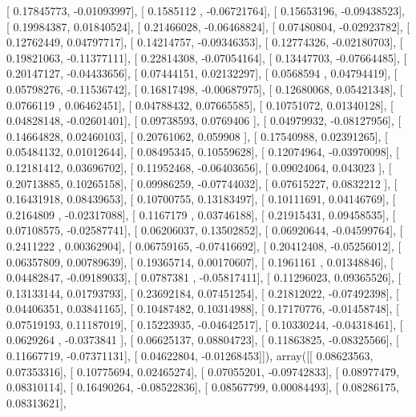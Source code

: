 \documentclass{article}
\begin{document}
       [ 0.17845773, -0.01093997],
       [ 0.1585112 , -0.06721764],
       [ 0.15653196, -0.09438523],
       [ 0.19984387,  0.01840524],
       [ 0.21466028, -0.06468824],
       [ 0.07480804, -0.02923782],
       [ 0.12762449,  0.04797717],
       [ 0.14214757, -0.09346353],
       [ 0.12774326, -0.02180703],
       [ 0.19821063, -0.11377111],
       [ 0.22814308, -0.07054164],
       [ 0.13447703, -0.07664485],
       [ 0.20147127, -0.04433656],
       [ 0.07444151,  0.02132297],
       [ 0.0568594 ,  0.04794419],
       [ 0.05798276, -0.11536742],
       [ 0.16817498, -0.00687975],
       [ 0.12680068,  0.05421348],
       [ 0.0766119 ,  0.06462451],
       [ 0.04788432,  0.07665585],
       [ 0.10751072,  0.01340128],
       [ 0.04828148, -0.02601401],
       [ 0.09738593,  0.0769406 ],
       [ 0.04979932, -0.08127956],
       [ 0.14664828,  0.02460103],
       [ 0.20761062,  0.059908  ],
       [ 0.17540988,  0.02391265],
       [ 0.05484132,  0.01012644],
       [ 0.08495345,  0.10559628],
       [ 0.12074964, -0.03970098],
       [ 0.12181412,  0.03696702],
       [ 0.11952468, -0.06403656],
       [ 0.09024064,  0.043023  ],
       [ 0.20713885,  0.10265158],
       [ 0.09986259, -0.07744032],
       [ 0.07615227,  0.0832212 ],
       [ 0.16431918,  0.08439653],
       [ 0.10700755,  0.13183497],
       [ 0.10111691,  0.04146769],
       [ 0.2164809 , -0.02317088],
       [ 0.1167179 ,  0.03746188],
       [ 0.21915431,  0.09458535],
       [ 0.07108575, -0.02587741],
       [ 0.06206037,  0.13502852],
       [ 0.06920644, -0.04599764],
       [ 0.2411222 ,  0.00362904],
       [ 0.06759165, -0.07416692],
       [ 0.20412408, -0.05256012],
       [ 0.06357809,  0.00789639],
       [ 0.19365714,  0.00170607],
       [ 0.1961161 ,  0.01348846],
       [ 0.04482847, -0.09189033],
       [ 0.0787381 , -0.05817411],
       [ 0.11296023,  0.09365526],
       [ 0.13133144,  0.01793793],
       [ 0.23692184,  0.07451254],
       [ 0.21812022, -0.07492398],
       [ 0.04406351,  0.03841165],
       [ 0.10487482,  0.10314988],
       [ 0.17170776, -0.01458748],
       [ 0.07519193,  0.11187019],
       [ 0.15223935, -0.04642517],
       [ 0.10330244, -0.04318461],
       [ 0.0629264 , -0.0373841 ],
       [ 0.06625137,  0.08804723],
       [ 0.11863825, -0.08325566],
       [ 0.11667719, -0.07371131],
       [ 0.04622804, -0.01268453]]), array([[ 0.08623563,  0.07353316],
       [ 0.10775694,  0.02465274],
       [ 0.07055201, -0.09742833],
       [ 0.08977479,  0.08310114],
       [ 0.16490264, -0.08522836],
       [ 0.08567799,  0.00084493],
       [ 0.08286175,  0.08313621],
\end{document}
